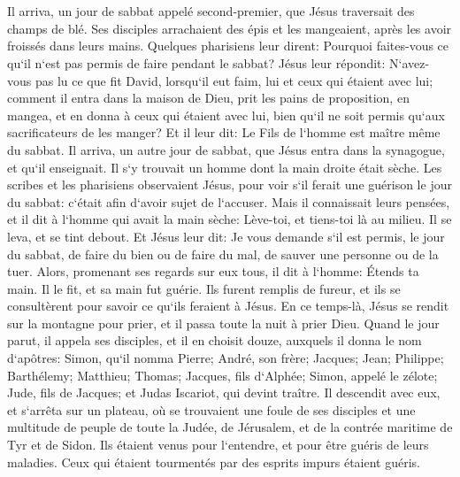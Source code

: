 \chapter{}

\verse Il arriva, un jour de sabbat appelé second-premier, que Jésus traversait des champs de blé. Ses disciples arrachaient des épis et les mangeaient, après les avoir froissés dans leurs mains. 
\verse Quelques pharisiens leur dirent: Pourquoi faites-vous ce qu`il n`est pas permis de faire pendant le sabbat? 
\verse Jésus leur répondit: N`avez-vous pas lu ce que fit David, lorsqu`il eut faim, lui et ceux qui étaient avec lui; 
\verse comment il entra dans la maison de Dieu, prit les pains de proposition, en mangea, et en donna à ceux qui étaient avec lui, bien qu`il ne soit permis qu`aux sacrificateurs de les manger? 
\verse Et il leur dit: Le Fils de l`homme est maître même du sabbat. 
\verse Il arriva, un autre jour de sabbat, que Jésus entra dans la synagogue, et qu`il enseignait. Il s`y trouvait un homme dont la main droite était sèche. 
\verse Les scribes et les pharisiens observaient Jésus, pour voir s`il ferait une guérison le jour du sabbat: c`était afin d`avoir sujet de l`accuser. 
\verse Mais il connaissait leurs pensées, et il dit à l`homme qui avait la main sèche: Lève-toi, et tiens-toi là au milieu. Il se leva, et se tint debout. 
\verse Et Jésus leur dit: Je vous demande s`il est permis, le jour du sabbat, de faire du bien ou de faire du mal, de sauver une personne ou de la tuer. 
\verse Alors, promenant ses regards sur eux tous, il dit à l`homme: Étends ta main. Il le fit, et sa main fut guérie. 
\verse Ils furent remplis de fureur, et ils se consultèrent pour savoir ce qu`ils feraient à Jésus. 
\verse En ce temps-là, Jésus se rendit sur la montagne pour prier, et il passa toute la nuit à prier Dieu. 
\verse Quand le jour parut, il appela ses disciples, et il en choisit douze, auxquels il donna le nom d`apôtres: 
\verse Simon, qu`il nomma Pierre; André, son frère; Jacques; Jean; Philippe; Barthélemy; 
\verse Matthieu; Thomas; Jacques, fils d`Alphée; Simon, appelé le zélote; 
\verse Jude, fils de Jacques; et Judas Iscariot, qui devint traître. 
\verse Il descendit avec eux, et s`arrêta sur un plateau, où se trouvaient une foule de ses disciples et une multitude de peuple de toute la Judée, de Jérusalem, et de la contrée maritime de Tyr et de Sidon. Ils étaient venus pour l`entendre, et pour être guéris de leurs maladies. 
\verse Ceux qui étaient tourmentés par des esprits impurs étaient guéris. 
